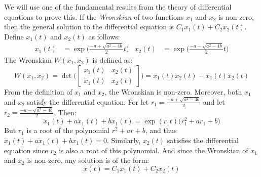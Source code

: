             \begin{bproof}
                We will use one of the fundamental results from
                the theory of differential equations to prove this.
                If the \textit{Wronskian} of two functions $x_{1}$
                and $x_{2}$ is non-zero, then the general solution
                to the differential equation is
                $C_{1}x_{1}(t)+C_{2}x_{2}(t)$. Define $x_{1}(t)$
                and $x_{2}(t)$ as follows:
                \begin{align*}
                    x_{1}(t)&=
                    \exp\Big(\frac{-a+\sqrt{a^{2}-4b}}{2}t\Big)
                    &
                    x_{2}(t)&=
                    \exp\Big(\frac{-a-\sqrt{a^{2}-4b}}{2}t\Big)
                \end{align*}
                The Wronskian $W(x_{1},x_{2})$ is defined as:
                \begin{equation*}
                    W(x_{1},x_{2})=\det\bigg(
                    \begin{bmatrix}
                        x_{1}(t)&x_{2}(t)\\
                        \dot{x}_{1}(t)&\dot{x}_{2}(t)
                    \end{bmatrix}
                    \bigg)
                    =x_{1}(t)\dot{x}_{2}(t)-\dot{x}_{1}(t)x_{2}(t)
                \end{equation*}
                From the definition of $x_{1}$ and $x_{2}$,
                the Wronskian is non-zero. Moreover, both $x_{1}$
                and $x_{2}$ satisfy the differential equation.
                For let $r_{1}=\frac{-a+\sqrt{a^{2}-4b}}{2}$
                and let $r_{2}=\frac{-a-\sqrt{a^{2}-4b}}{2}$.
                Then:
                \begin{equation*}
                    \ddot{x}_{1}(t)+a\dot{x}_{1}(t)+bx_{1}(t)
                    =\exp(r_{1}t)\big(r_{1}^{2}+ar_{1}+b\big)
                \end{equation*}
                But $r_{1}$ is a root of the polynomial
                $r^{2}+ar+b$, and thus
                $\ddot{x}_{1}(t)+a\dot{x}_{1}(t)+bx_{1}(t)=0$.
                Similarly, $x_{2}(t)$ satisfies the differential
                equation since $r_{2}$ is also a root of this
                polynomial. And since the Wronskian
                of $x_{1}$ and $x_{2}$ is non-zero, any solution
                is of the form:
                \begin{equation*}
                    x(t)=C_{1}x_{1}(t)+C_{2}x_{2}(t)

\end{equation*}
\end{bproof}
